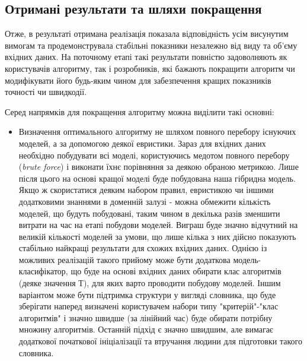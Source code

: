 \subsection{Отримані результати та шляхи покращення}
Отже, в результаті отримана реалізація показала відповідність усім висунутим вимогам та продемонструвала стабільні показники незалежно від виду та об'єму вхідних даних. На поточному етапі такі результати повністю задоволняють як користувачів алгоритму, так і розробників, які бажають покращити алгоритм чи модифікувати його будь-яким чином для забезпечення кращих показників точності чи швидкодії.

Серед напрямків для покращення алгоритму можна виділити такі основні:

\begin{itemize}
	\item Визначення оптимального алгоритму не шляхом повного перебору існуючих моделей, а за допомогою деякої евристики. Зараз для вхідних даних необхідно побудувати всі моделі, користуючись медотом повного перебору (\textit{brute force}) і виконати їхнє порівняння за деякою обраною метрикою. Лише після цього на основі кращої моделі буде побудована наша гібридна модель. Якщо ж скористатися деяким набором правил, евристикою чи іншими додатковими знаннями в доменній залузі - можна обмежити кількість моделей, що будуть побудовані, таким чином в декілька разів зменшити витрати на час на етапі побудови моделей. Виграш буде значно відчутний на великій кількості моделей за умови, що лише кілька з них дійсно показують стабільно найкращі результати для схожих вхідних даних. Однією із можливих реалізацій такого прийому може бути додаткова модель-класифікатор, що буде на основі вхідних даних обирати клас алгоритмів (деяке значення Т), для яких варто проводити побудову моделей. Іншим варіантом може бути підтримка структури у вигляді словника, що буде зберігати наперед визначені користувачем набори типу "критерій"-"клас алгоритмів" і значно швидше (за лінійний час) буде обирати потрібну множину алгоритмів. Останній підхід є значно швидшим, але вимагає додаткової початкової ініціалізації та втручання людини для підготовки такого словника.

\end{itemize}
